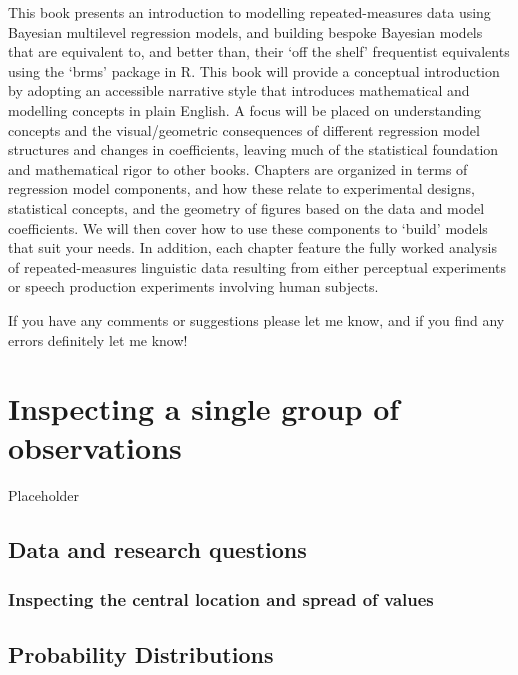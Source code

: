 \documentclass[
]{book}
\begin{document}
This book presents an introduction to modelling repeated-measures data using Bayesian multilevel regression models, and building bespoke Bayesian models that are equivalent to, and better than, their `off the shelf' frequentist equivalents using the `brms' package in R. This book will provide a conceptual introduction by adopting an accessible narrative style that introduces mathematical and modelling concepts in plain English. A focus will be placed on understanding concepts and the visual/geometric consequences of different regression model structures and changes in coefficients, leaving much of the statistical foundation and mathematical rigor to other books. Chapters are organized in terms of regression model components, and how these relate to experimental designs, statistical concepts, and the geometry of figures based on the data and model coefficients. We will then cover how to use these components to `build' models that suit your needs. In addition, each chapter feature the fully worked analysis of repeated-measures linguistic data resulting from either perceptual experiments or speech production experiments involving human subjects.

If you have any comments or suggestions please let me know, and if you find any errors definitely let me know!

\hypertarget{inspecting-a-single-group-of-observations}{%
\chapter{Inspecting a single group of observations}\label{inspecting-a-single-group-of-observations}}

Placeholder

\hypertarget{data-and-research-questions}{%
\section{Data and research questions}\label{data-and-research-questions}}

\hypertarget{inspecting-the-central-location-and-spread-of-values}{%
\subsection{Inspecting the central location and spread of values}\label{inspecting-the-central-location-and-spread-of-values}}

\hypertarget{probability-distributions}{%
\section{Probability Distributions}\label{probability-distributions}}
\end{document}
